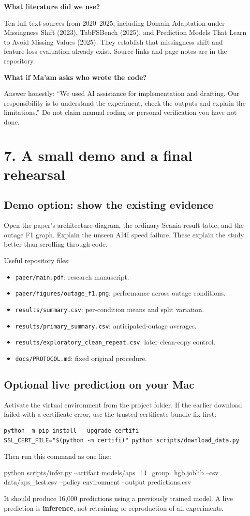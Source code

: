 \documentclass[11pt,a4paper]{article}
\newcommand{\qa}[2]{\textbf{#1}\par #2\par}
\begin{document}
\qa{What literature did we use?}{Ten full-text sources from 2020--2025, including Domain Adaptation under Missingness Shift (2023), TabFSBench (2025), and Prediction Models That Learn to Avoid Missing Values (2025). They establish that missingness shift and feature-loss evaluation already exist. Source links and page notes are in the repository.}
\qa{What if Ma'am asks who wrote the code?}{Answer honestly: ``We used AI assistance for implementation and drafting. Our responsibility is to understand the experiment, check the outputs and explain the limitations.'' Do not claim manual coding or personal verification you have not done.}

\endgroup
\newpage
\section*{7. A small demo and a final rehearsal}
\subsection*{Demo option: show the existing evidence}
Open the paper's architecture diagram, the ordinary Scania result table, and the outage F1 graph. Explain the unseen AI4I speed failure. These explain the study better than scrolling through code.

Useful repository files:
\begin{itemize}
\item \texttt{paper/main.pdf}: research manuscript.
\item \texttt{paper/figures/outage\_f1.png}: performance across outage conditions.
\item \texttt{results/summary.csv}: per-condition means and split variation.
\item \texttt{results/primary\_summary.csv}: anticipated-outage averages.
\item \texttt{results/exploratory\_clean\_repeat.csv}: later clean-copy control.
\item \texttt{docs/PROTOCOL.md}: fixed original procedure.
\end{itemize}

\subsection*{Optional live prediction on your Mac}
Activate the virtual environment from the project folder. If the earlier download failed with a certificate error, use the trusted certificate-bundle fix first:
\begin{verbatim}
python -m pip install --upgrade certifi
SSL_CERT_FILE="$(python -m certifi)" python scripts/download_data.py
\end{verbatim}
Then run this command as one line:
\begin{flushleft}\ttfamily\footnotesize\raggedright
python scripts/infer.py --artifact models/aps\_11\_group\_hgb.joblib --csv data/aps\_test.csv --policy environment --output predictions.csv
\end{flushleft}
It should produce 16,000 predictions using a previously trained model. A live prediction is \textbf{inference}, not retraining or reproduction of all experiments.
\end{document}
